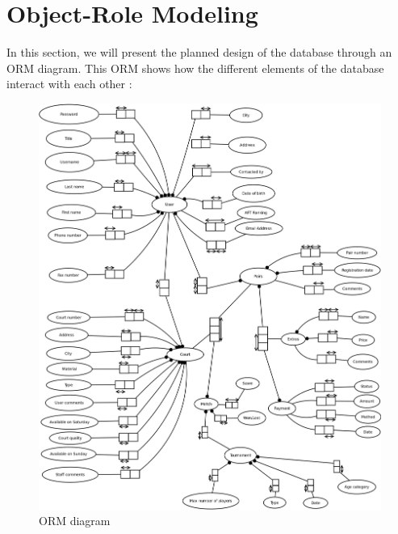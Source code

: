 \section{Object-Role Modeling}

In this section, we will present the planned design of the database through an ORM diagram. This ORM shows how the different elements of the database interact with each other :


\begin{figure}[!ht]
    \centering
    \includegraphics[width=\linewidth]{ORM.png}
    \caption{ORM diagram}
\end{figure}
\FloatBarrier
